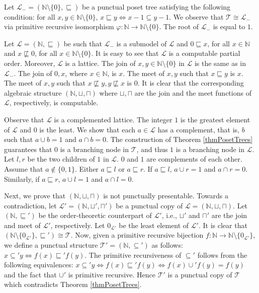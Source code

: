 \documentclass[a4paper,UKenglish,cleveref, autoref, thm-restate]{lipics-v2021}
\begin{document}
    \begin{claimproof}
    Let $\mathcal L_- = (\mathbb N \setminus \{0\}, \sqsubseteq)$ be a punctual poset tree satisfying the following condition: for all $x,y \in \mathbb N \setminus \{0\}$, $x \sqsubseteq y \Leftrightarrow x -1 \subseteq y-1$. We observe that $\mathcal T \cong \mathcal L_-$ via primitive recursive isomorphism $\varphi: \mathbb N \to \mathbb N\setminus \{0\}$. The root of $\mathcal L_-$ is equal to $1$.
    
     Let $\mathcal L = (\mathbb N,\sqsubseteq)$ be such that $\mathcal L_-$ is a submodel of $\mathcal L$ and $0 \sqsubseteq x$, for all $x \in \mathbb N$ and $x \not\sqsubseteq 0$, for all $x \in \mathbb N \setminus \{0\}$. It is easy to see that $\mathcal L$ is a computable partial order. Moreover, $\mathcal L$ is a lattice. The join of $x,y \in \mathbb{N} \setminus \{0\}$ in $\mathcal L$ is the same as in $\mathcal L_-$. The join of $0,x$, where $x \in \mathbb N$, is $x$. The meet of $x,y$ such that $x \sqsubseteq y$ is $x$. The meet of $x, y$ such that $x \not\sqsubseteq y, y \not\sqsubseteq x$ is $0$. It is clear that the corresponding algebraic structure $(\mathbb N, \sqcup, \sqcap)$ where $\sqcup,\sqcap $ are the join and the meet functions of $\mathcal L$, respectively, is computable. 
    
    Observe that $\mathcal  L$ is a complemented lattice. The integer $1$ is the greatest element of $\mathcal L$ and $0$ is the least. We show that each $a \in \mathcal L$ has a complement, that is, $b$ such that $a \cup b = 1$ and $a \cap b = 0$. The construction of Theorem \ref{thmPosetTrees} guarantees that $0$ is a branching node in $\mathcal T$, and thus $1$ is a branching node in $\mathcal L$. Let $l,r$ be the two children of $1$ in $ \mathcal L$. $0$ and $1$ are complements of each other. Assume that $a \notin \{0,1\}$. Either $a \sqsubseteq l$ or $a \sqsubseteq r$. If $a \sqsubseteq l$, $a \cup r = 1$ and $a \cap r = 0$. Similarly, if $a \sqsubseteq r$, $a \cup l = 1$ and $a \cap l = 0$.


    Next, we prove that $(\mathbb N, \sqcup, \sqcap)$ is not punctually presentable. Towards a contradiction, let $\mathcal L' = (\mathbb N, \sqcup',\sqcap')$ be a punctual copy of $\mathcal L = (\mathbb N, \sqcup,\sqcap)$. Let $(\mathbb N, \sqsubseteq')$ be the order-theoretic counterpart of $\mathcal L'$, i.e., $\sqcup'$ and $\sqcap'$ are the join and meet of $\mathcal L'$, respectively. Let $0_{\mathcal L'}$ be the least element of $\mathcal L'$. It is clear that $(\mathbb N \setminus \{0_{\mathcal L'}\}, \sqsubseteq') \cong \mathcal T$. Now, given a primitive recursive bijection $f : \mathbb N \to \mathbb N \setminus \{0_{\mathcal L'}\}$, we define a punctual structure $\mathcal T' = (\mathbb N, \subseteq')$ as follows: $x \subseteq' y \Leftrightarrow f(x) \sqsubseteq' f(y)$. The primitive recursiveness of $\subseteq'$ follows from the following equivalences: $x \subseteq' y \Leftrightarrow f(x) \sqsubseteq' f(y) \Leftrightarrow f(x) \cup' f(y) = f(y)$ and the fact that $\cup'$ is primitive recursive. Hence $\mathcal T'$ is a punctual copy of $\mathcal T$ which contradicts Theorem \ref{thmPosetTrees}.
\end{claimproof}
\end{document}
